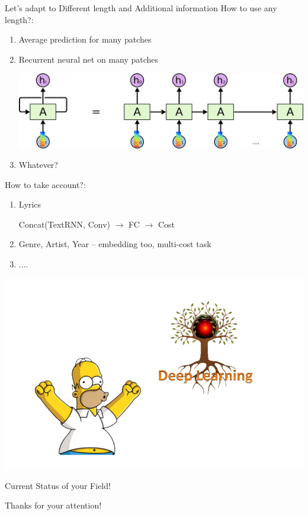 \documentclass{beamer}
\begin{document}
\begin{frame}{Let's adapt to Different length and Additional information} 
	   How to use any length?:
	\begin{enumerate}
		\item      Average prediction for many patches 		
		\item      Recurrent neural net on many patches
		\begin{center}				
			   \includegraphics[scale=0.25]{img/rnn}
		\end{center} 
		\item      Whatever?
	\end{enumerate}
	   How to take account?:
	\begin{enumerate}
		\item      Lyrics
		\begin{center}
		   	Concat(TextRNN, Conv) $\rightarrow$ FC $\rightarrow$ Cost
		\end{center}
		\item      Genre, Artist, Year    -- embedding too, multi-cost task
		\item      ....
	\end{enumerate}
\end{frame}

\begin{frame}{} 
	\begin{center}				
		\includegraphics[scale=0.35]{img/csf}
		
		{\huge Current Status of your Field!}
		
		Thanks for your attention!
	\end{center}
\end{frame}
\end{document}
